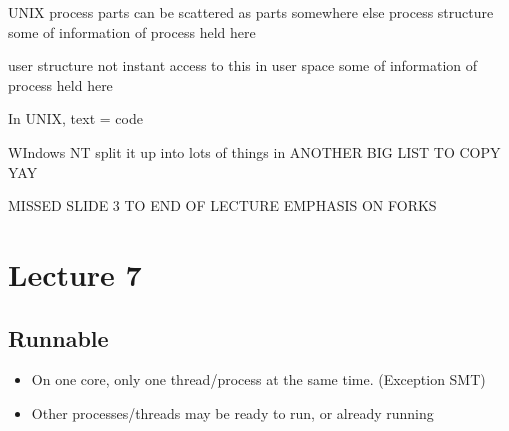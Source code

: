 \documentclass{article}
\begin{document}
	UNIX process parts
		can be scattered as parts somewhere else
		process structure
			some of information of process held here

		user structure
			not instant access to this
			in user space
			some of information of process held here

		In UNIX, text = code

	WIndows NT
		split it up into lots of things in ANOTHER BIG LIST TO COPY YAY

		MISSED SLIDE 3 TO END OF LECTURE
			EMPHASIS ON FORKS

\section{Lecture 7}
	\subsection{Runnable}
		\begin{itemize}
			\item On one core, only one thread/process at the same time. (Exception SMT)
			\item Other processes/threads may be ready to run, or already running
		\end{itemize}
\end{document}
